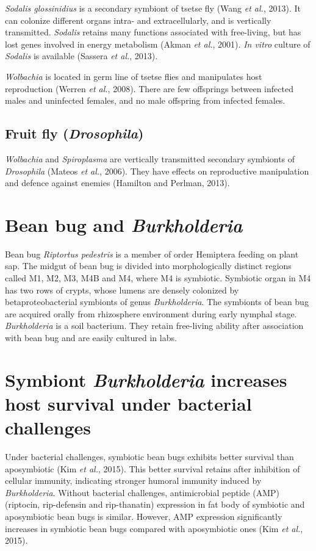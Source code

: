 \documentclass[11pt]{article}
\begin{document}
\newline

\textit{Sodalis glossinidius} is a secondary symbiont of tsetse fly (Wang \textit{et al.}, 2013). 
It can colonize different organs intra- and extracellularly, and is vertically transmitted. 
\textit{Sodalis} retains many functions associated with free-living, but has lost genes involved in energy metabolism (Akman \textit{et al.}, 2001). 
\textit{In vitro} culture of \textit{Sodalis} is available (Sassera \textit{et al.}, 2013). 

\newline

\textit{Wolbachia} is located in germ line of tsetse flies and manipulates host reproduction (Werren \textit{et al.}, 2008). 
There are few offsprings between infected males and uninfected females, and no male offspring from infected females.

\subsection{Fruit fly (\textit{Drosophila})}
\textit{Wolbachia} and \textit{Spiroplasma} are vertically transmitted secondary symbionts of \textit{Drosophila} (Mateos \textit{et al.}, 2006). 
They have effects on reproductive manipulation and defence against enemies (Hamilton and Perlman, 2013).

\section{Bean bug and \textit{Burkholderia}}
Bean bug \textit{Riptortus pedestris} is a member of order Hemiptera feeding on plant sap. 
The midgut of bean bug is divided into morphologically distinct regions called M1, M2, M3, M4B and M4, where M4 is symbiotic. 
Symbiotic organ in M4 has two rows of crypts, whose lumens are densely colonized by betaproteobacterial symbionts of genus \textit{Burkholderia}. 
The symbionts of bean bug are acquired orally from rhizosphere environment during early nymphal stage. 
\textit{Burkholderia} is a soil bacterium. 
They retain free-living ability after association with bean bug and are easily cultured in labs.

\section{Symbiont \textit{Burkholderia} increases host survival under bacterial challenges}
Under bacterial challenges, symbiotic bean bugs exhibits better survival than aposymbiotic (Kim \textit{et al.}, 2015). 
This better survival retains after inhibition of cellular immunity, indicating stronger humoral immunity induced by \textit{Burkholderia}. 
Without bacterial challenges, antimicrobial peptide (AMP) (riptocin, rip-defensin and rip-thanatin) expression in fat body of symbiotic and aposymbiotic bean bugs is similar. 
However, AMP expression significantly increases in symbiotic bean bugs compared with aposymbiotic ones (Kim \textit{et al.}, 2015).
\end{document}
